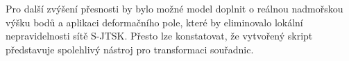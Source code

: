 \documentclass[12pt, a4paper]{article}
\begin{document}
Pro další zvýšení přesnosti by bylo možné model doplnit o reálnou nadmořskou výšku bodů a aplikaci deformačního pole, které by eliminovalo lokální nepravidelnosti sítě S-JTSK. Přesto lze konstatovat, že vytvořený skript představuje spolehlivý nástroj pro transformaci souřadnic.

\nocite{*}
\printbibliography[title={Zdroje a literatura}]


    
\end{document}
